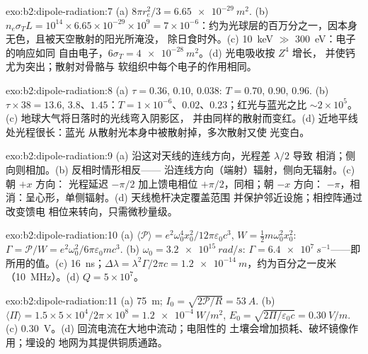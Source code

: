 \begin{solution}{exo:b2:dipole-radiation:7}
(a) $8\pi r_e^2/3 = \qty{6.65e-29}{m^2}$. (b) $n_e\sigma_TL = 10^{14} \times 6.65 \times 10^{-29}
\times 10^9 = 7 \times 10^{-6}$：约为光球层的百万分之一，因本身
无色，且被天空散射的阳光所淹没，
除日食时外。(c) \qty{10}{keV} $\gg$ \qty{300}{eV}：电子的响应如同
自由电子，$6\sigma_T = \qty{4e-28}{m^2}$。(d) 光电吸收按 $Z^4$ 增长，
并使钙尤为突出；散射对骨骼与
软组织中每个电子的作用相同。
\end{solution}

\begin{solution}{exo:b2:dipole-radiation:8}
(a) $\tau = 0.36$, $0.10$, $0.038$: $T = 0.70$, $0.90$, $0.96$. (b) $\tau \times 38 = 13.6$,
$3.8$、$1.45$：$T = 1 \times 10^{-6}$、$0.02$、$0.23$；红光与蓝光之比 $\sim 2 \times 10^5$。(c)
地球大气将日落时的光线弯入阴影区，
并由同样的散射而变红。(d) 近地平线处光程很长：蓝光
从散射光本身中被散射掉，多次散射又使
光变白。
\end{solution}

\begin{solution}{exo:b2:dipole-radiation:9}
(a) 沿这对天线的连线方向，光程差 $\lambda/2$ 导致
相消；侧向则相加。(b) 反相时情形相反——
沿连线方向（端射）辐射，侧向无辐射。(c) 朝 $+x$ 方向：
光程延迟 $-\pi/2$ 加上馈电相位 $+\pi/2$，同相；朝 $-x$ 方向：
$-\pi$，相消：呈心形，单侧辐射。(d) 天线桅杆决定覆盖范围
并保护邻近设施；相控阵通过改变馈电
相位来转向，只需微秒量级。
\end{solution}

\begin{solution}{exo:b2:dipole-radiation:10}
(a) $\langle\mathcal P\rangle = e^2\omega_0^4x_0^2/12\pi\varepsilon_0c^3$, $W = \tfrac12m\omega_0^2x_0^2$:
$\Gamma = \mathcal P/W = e^2\omega_0^2/6\pi\varepsilon_0mc^3$. (b) $\omega_0 = \qty{3.2e15}{rad/s}$: $\Gamma =
\qty{6.4e7}{s^{-1}}$——即所用的值。(c) \qty{16}{ns}；$\Delta\lambda = \lambda^2\Gamma/2\pi c =
\qty{1.2e-14}{m}$，约为百分之一皮米（\qty{10}{MHz}）。(d) $Q = 5 \times 10^7$。
\end{solution}

\begin{solution}{exo:b2:dipole-radiation:11}
(a) \qty{75}{m}; $I_0 = \sqrt{2\mathcal P/R} = \qty{53}{A}$. (b) $\langle\Pi\rangle = 1.5 \times
5 \times 10^4/2\pi \times 10^8 = \qty{1.2e-4}{W/m^2}$, $E_0 = \sqrt{2\Pi/\varepsilon_0c} = \qty{0.30}{V/m}$.
(c) \qty{0.30}{V}。(d) 回流电流在大地中流动；电阻性的
土壤会增加损耗、破坏镜像作用；埋设的
地网为其提供铜质通路。
\end{solution}

